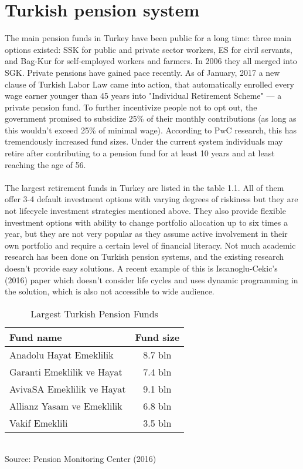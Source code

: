\section{Turkish pension system}
The main pension funds in Turkey have been public for a long time: three main options existed: SSK for public and private sector workers, ES for civil servants, and Bag-Kur for self-employed workers and farmers. In 2006 they all merged into SGK. Private pensions have gained pace recently. As of January, 2017 a new clause of Turkish Labor Law came into action, that automatically enrolled every wage earner younger than 45 years into "Individual Retirement Scheme" --- a private pension fund. To further incentivize people not to opt out, the government promised to subsidize 25\% of their monthly contributions (as long as this wouldn't exceed 25\% of minimal wage). According to PwC research, this has tremendously increased fund sizes. Under the current system individuals may retire after contributing to a pension fund for at least 10 years and at least reaching the age of 56.
\paragraph*{}
The largest retirement funds in Turkey are listed in the table 1.1. All of them offer 3-4 default investment options with varying degrees of riskiness but they are not lifecycle investment strategies mentioned above. They also provide flexible investment options with ability to change portfolio allocation up to six times a year, but they are not very popular as they assume active involvement in their own portfolio and require a certain level of financial literacy. Not much academic research has been done on Turkish pension systems, and the existing research doesn't provide easy solutions. A recent example of this is Iscanoglu-Cekic's (2016) paper which doesn't consider life cycles and uses dynamic programming in the solution, which is also not accessible to wide audience.

\begin{table}
	\centering
	\caption{Largest Turkish Pension Funds}
	\begin{tabular}[H]{lc}
		\hline
		Fund name&Fund size\\
		\hline
		Anadolu Hayat Emeklilik&8.7 bln\\
		Garanti Emeklilik ve Hayat&7.4 bln\\
		AvivaSA Emeklilik ve Hayat&9.1 bln\\
		Allianz Yasam ve Emeklilik&6.8 bln\\
		Vakif Emeklili&3.5 bln\\
		\hline
	\end{tabular}\\
	Source: Pension Monitoring Center (2016)
\end{table}

